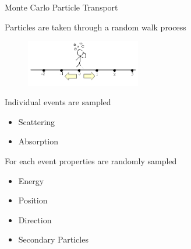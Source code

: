 \documentclass{beamer}
\begin{document}
\begin{frame}{Monte Carlo Particle Transport}

 \begin{block}{Particles are taken through a random walk process}
 
 \begin{figure}
  \centering
  \includegraphics[width=50mm]{drunkchap.png}
\end{figure}

\end{block}

 \begin{block}{Individual events are sampled}
 
    \begin{itemize}
      \item Scattering
      \item Absorption
    \end{itemize}
    
\end{block}

 \begin{block}{For each event properties are randomly sampled}
    
     \begin{itemize}
      \item Energy
      \item Position
      \item Direction
      \item Secondary Particles
    \end{itemize}
\end{block}
 

\end{frame}
\end{document}
